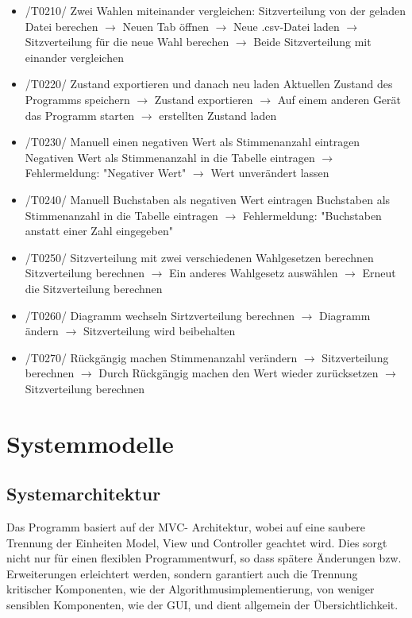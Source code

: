 \documentclass[10pt,a4paper]{article}
\begin{document}
\begin{itemize}
	\item /T0210/ Zwei Wahlen miteinander vergleichen:
	Sitzverteilung von der geladen Datei berechen $\rightarrow$ Neuen Tab öffnen $\rightarrow$ Neue .csv-Datei laden $\rightarrow$ Sitzverteilung für die neue Wahl berechen $\rightarrow$ Beide Sitzverteilung mit einander vergleichen
	\item /T0220/ Zustand exportieren und danach neu laden
	Aktuellen Zustand des Programms speichern $\rightarrow$ Zustand exportieren $\rightarrow$ Auf einem anderen Gerät das Programm starten $\rightarrow$ erstellten Zustand laden
	\item /T0230/ Manuell einen negativen Wert als Stimmenanzahl eintragen
	Negativen Wert als Stimmenanzahl in die Tabelle eintragen $\rightarrow$ Fehlermeldung: "Negativer Wert" $\rightarrow$ Wert unverändert lassen
	\item /T0240/ Manuell Buchstaben als negativen Wert eintragen
	Buchstaben als Stimmenanzahl in die Tabelle eintragen $\rightarrow$ Fehlermeldung: "Buchstaben anstatt einer Zahl eingegeben"
	\item /T0250/ Sitzverteilung mit zwei verschiedenen Wahlgesetzen berechnen
	Sitzverteilung berechnen $\rightarrow$ Ein anderes Wahlgesetz auswählen $\rightarrow$ Erneut die Sitzverteilung berechnen
	\item /T0260/ Diagramm wechseln
	Sirtzverteilung berechnen $\rightarrow$ Diagramm ändern $\rightarrow$ Sitzverteilung wird beibehalten
	\item /T0270/ Rückgängig machen
	Stimmenanzahl verändern $\rightarrow$ Sitzverteilung berechnen $\rightarrow$ Durch Rückgängig machen den Wert wieder zurücksetzen $\rightarrow$ Sitzverteilung berechnen
\end{itemize}
\section{Systemmodelle}
\subsection{Systemarchitektur}
Das Programm basiert auf der MVC- Architektur, wobei auf eine saubere Trennung der Einheiten Model, View und Controller geachtet wird. Dies sorgt nicht nur für einen flexiblen Programmentwurf, so dass spätere Änderungen bzw. Erweiterungen erleichtert werden, sondern garantiert auch die Trennung kritischer Komponenten, wie der Algorithmusimplementierung, von weniger sensiblen Komponenten, wie der GUI, und dient allgemein der Übersichtlichkeit.
\end{document}
